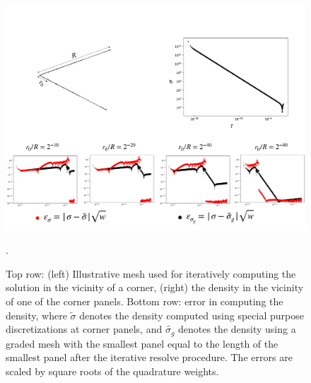 \begin{figure}
\begin{center}
\includegraphics[width=\linewidth]{media/density}
\caption{Top row: (left) Illustrative mesh used for iteratively computing the solution in the vicinity of a corner, (right) the density in the vicinity of one of the corner panels. Bottom row: error in computing the density, where $\tilde{\sigma}$ denotes the density computed using special purpose discretizations at corner panels, and $\tilde{\sigma_{g}}$ denotes the density using a graded mesh with the smallest panel equal to the length of the smallest panel after the iterative resolve procedure. The errors are scaled by square roots of the quadrature weights.    }.
\label{fig:dens-error}
\end{center}
\end{figure}

